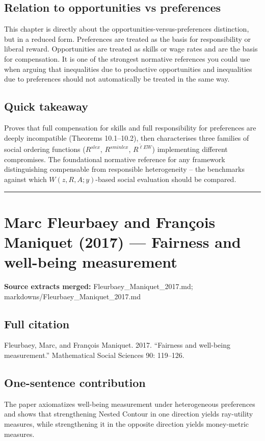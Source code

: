 \documentclass[11pt,a4paper]{article}
\begin{document}
\subsection*{Relation to opportunities vs preferences}
This chapter is directly about the opportunities-versus-preferences distinction, but in a reduced form. Preferences are treated as the basis for responsibility or liberal reward. Opportunities are treated as skills or wage rates and are the basis for compensation. It is one of the strongest normative references you could use when arguing that inequalities due to productive opportunities and inequalities due to preferences should not automatically be treated in the same way.

\subsection*{Quick takeaway}
Proves that full compensation for skills and full responsibility for preferences are deeply incompatible (Theorems 10.1--10.2), then characterises three families of social ordering functions ($R^{slex}$, $R^{sminlex}$, $R^{\tilde{\ell}EW}$) implementing different compromises. The foundational normative reference for any framework distinguishing compensable from responsible heterogeneity -- the benchmarks against which $W(z,R,A;y)$-based social evaluation should be compared.


\medskip\hrule\medskip

\section*{Marc Fleurbaey and François Maniquet (2017) — Fairness and well-being measurement}

\textbf{Source extracts merged:} Fleurbaey\_Maniquet\_2017.md; markdowns/Fleurbaey\_Maniquet\_2017.md

\subsection*{Full citation}
Fleurbaey, Marc, and François Maniquet. 2017. “Fairness and well-being measurement.” Mathematical Social Sciences 90: 119–126.

\subsection*{One-sentence contribution}
The paper axiomatizes well-being measurement under heterogeneous preferences and shows that strengthening Nested Contour in one direction yields ray-utility measures, while strengthening it in the opposite direction yields money-metric measures.
\end{document}
